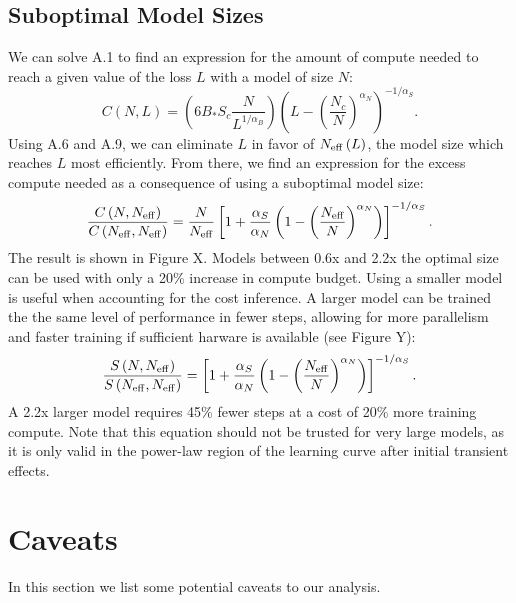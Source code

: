 \documentclass[english]{article}
\newcommand{\be}{\begin{equation}}
\newcommand{\ee}{\end{equation}}
\begin{document}
\subsection{Suboptimal Model Sizes}
\label{sec:suboptimal-models}
We can solve A.1 to find an expression for the amount of compute needed to reach a given value of the loss $L$ with a model of size $N$:
\be
C\left(N,L\right)=\left(6B_{\ast}S_{c}\frac{N}{L^{1/\alpha_{B}}}\right)\left(L-\left(\frac{N_{c}}{N}\right)^{\alpha_{N}}\right)^{-1/\alpha_{S}}.
\ee
Using A.6 and A.9, we can eliminate $L$ in favor of $N_{{\rm eff}}\left(L\right)$, the model size which reaches $L$ most efficiently. From there, we find an expression for the excess compute needed as a consequence of using a suboptimal model size: 
\be
\frac{C\left(N,N_{{\rm eff}}\right)}{C\left(N_{{\rm eff}},N_{{\rm eff}}\right)}=\frac{N}{N_{{\rm eff}}}\left[1+\frac{\alpha_{S}}{\alpha_{N}}\left(1-\left(\frac{N_{{\rm eff}}}{N}\right)^{\alpha_{N}}\right)\right]^{-1/\alpha_{S}}.
\ee
The result is shown in Figure X. Models between 0.6x and 2.2x the optimal size can be used with only a 20\% increase in compute budget. Using a smaller model is useful when accounting for the cost inference. A larger model can be trained the the same level of performance in fewer steps, allowing for more parallelism and faster training if sufficient harware is available (see Figure Y):
\be
\frac{S\left(N,N_{{\rm eff}}\right)}{S\left(N_{{\rm eff}},N_{{\rm eff}}\right)}=\left[1+\frac{\alpha_{S}}{\alpha_{N}}\left(1-\left(\frac{N_{{\rm eff}}}{N}\right)^{\alpha_{N}}\right)\right]^{-1/\alpha_{S}}.
\ee
A 2.2x larger model requires 45\% fewer steps at a cost of 20\% more training compute. Note that this equation should not be trusted for very large models, as it is only valid in the power-law region of the learning curve after initial transient effects.



\section{Caveats}

In this section we list some potential caveats to our analysis.
\end{document}
